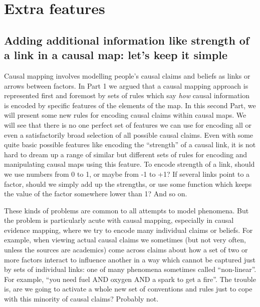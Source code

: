 \documentclass[
]{book}
\begin{document}
\hypertarget{part-extra-features}{%
\part{Extra features}\label{part-extra-features}}

\hypertarget{adding-additional-information-like-strength-of-a-link-in-a-causal-map-lets-keep-it-simple}{%
\chapter{Adding additional information like strength of a link in a causal map: let's keep it simple}\label{adding-additional-information-like-strength-of-a-link-in-a-causal-map-lets-keep-it-simple}}

Causal mapping involves modelling people's causal claims and beliefs as links or arrows between factors. In Part 1 we argued that a causal mapping approach is represented first and foremost by sets of rules which say \emph{how} causal information is encoded by specific features of the elements of the map. In this second Part, we will present some new rules for encoding causal claims within causal maps. We will see that there is no one perfect set of features we can use for encoding all or even a satisfactorily broad selection of all possible causal claims. Even with some quite basic possible features like encoding the ``strength'' of a causal link, it is not hard to dream up a range of similar but different sets of rules for encoding and manipulating causal maps using this feature. To encode strength of a link, should we use numbers from 0 to 1, or maybe from -1 to +1? If several links point to a factor, should we simply add up the strengths, or use some function which keeps the value of the factor somewhere lower than 1? And so on.

These kinds of problems are common to all attempts to model phenomena. But the problem is particularly acute with causal mapping, especially in causal evidence mapping, where we try to encode many individual claims or beliefs. For example, when viewing actual causal claims we sometimes (but not very often, unless the sources are academics) come across claims about how a set of two or more factors interact to influence another in a way which cannot be captured just by sets of individual links: one of many phenomena sometimes called ``non-linear''. For example, ``you need fuel AND oxygen AND a spark to get a fire''. The trouble is, are we going to activate a whole new set of conventions and rules just to cope with this minority of causal claims? Probably not.
\end{document}
